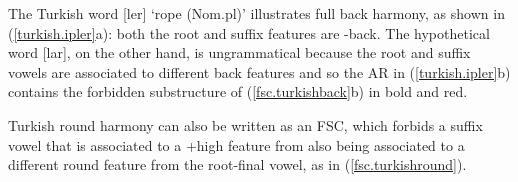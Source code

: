 \documentclass[,doc,floatsintext]{apa6}
\theoremstyle{definition}
\theoremstyle{definition}
\theoremstyle{definition}
\theoremstyle{remark}
\begin{document}
\noindent The Turkish word {[}ler{]} `rope (Nom.pl)'
illustrates full back harmony, as shown in (\ref{turkish.ipler}a): both
the root and suffix features are -back. The hypothetical word
{[}lar{]}, on the other hand, is ungrammatical
because the root and suffix vowels are associated to different back
features and so the AR in (\ref{turkish.ipler}b) contains the forbidden
substructure of (\ref{fsc.turkishback}b) in bold and red.

Turkish round harmony can also be written as an FSC, which forbids a
suffix vowel that is associated to a +high feature from also being
associated to a different round feature from the root-final vowel, as in
(\ref{fsc.turkishround}).

\begin{exe}
\ex \label{fsc.turkishround}
\end{exe}
\end{document}
